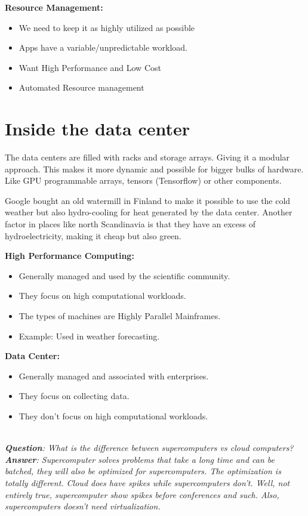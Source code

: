 \documentclass[twoside]{article}
\begin{document}
\textbf{Resource Management:} 
\begin{itemize}
  \item We need to keep it as highly utilized as possible
  \item Apps have a variable/unpredictable workload.
  \item Want High Performance and Low Cost
  \item Automated Resource management
\end{itemize}



\section{Inside the data center}
The data centers are filled with racks and storage arrays. Giving it a modular approach. This makes it more dynamic and possible for bigger bulks of hardware. Like GPU programmable arrays, tensors (Tensorflow) or other components. 



Google bought an old watermill in Finland to make it possible to use the cold weather but also hydro-cooling for heat generated by the data center. Another factor in places like north Scandinavia is that they have an excess of hydroelectricity, making it cheap but also green. 

\textbf{High Performance Computing:} 
\begin{itemize}
  \item Generally managed and used by the scientific community.
  \item They focus on high computational workloads.
  \item The types of machines are Highly Parallel Mainframes.
  \item Example: Used in weather forecasting.
\end{itemize}

\textbf{Data Center:} 
\begin{itemize}
  \item Generally managed and associated with enterprises.
  \item They focus on collecting data.
  \item They don't focus on high computational workloads.
\end{itemize}

\\\emph{\textbf{Question}: What is the difference between supercomputers vs cloud computers?}
\\\emph{\textbf{Answer}: Supercomputer solves problems that take a long time and can be batched, they will also be optimized for supercomputers. The optimization is totally different. Cloud does have spikes while supercomputers don't. Well, not entirely true, supercomputer show spikes before conferences and such. Also, supercomputers doesn't need virtualization.}\\
\end{document}
